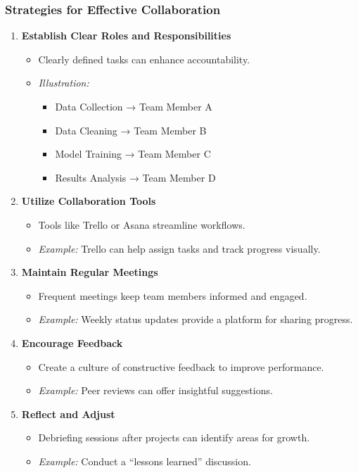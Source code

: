 \documentclass[aspectratio=169]{beamer}
\begin{document}
\begin{frame}[fragile]
    \frametitle{Strategies for Effective Collaboration}
    \begin{enumerate}
        \item \textbf{Establish Clear Roles and Responsibilities}
            \begin{itemize}
                \item Clearly defined tasks can enhance accountability.
                \item \textit{Illustration:} 
                \begin{itemize}
                    \item Data Collection → Team Member A
                    \item Data Cleaning → Team Member B
                    \item Model Training → Team Member C
                    \item Results Analysis → Team Member D
                \end{itemize}
            \end{itemize}
        
        \item \textbf{Utilize Collaboration Tools}
            \begin{itemize}
                \item Tools like Trello or Asana streamline workflows.
                \item \textit{Example:} Trello can help assign tasks and track progress visually.
            \end{itemize}
        
        \item \textbf{Maintain Regular Meetings}
            \begin{itemize}
                \item Frequent meetings keep team members informed and engaged.
                \item \textit{Example:} Weekly status updates provide a platform for sharing progress.
            \end{itemize}
        
        \item \textbf{Encourage Feedback}
            \begin{itemize}
                \item Create a culture of constructive feedback to improve performance.
                \item \textit{Example:} Peer reviews can offer insightful suggestions.
            \end{itemize}
        
        \item \textbf{Reflect and Adjust}
            \begin{itemize}
                \item Debriefing sessions after projects can identify areas for growth.
                \item \textit{Example:} Conduct a “lessons learned” discussion.
            \end{itemize}
    \end{enumerate}
\end{frame}
\end{document}
